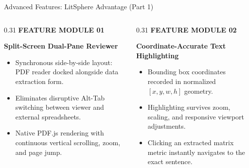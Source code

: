 \documentclass[aspectratio=169,10pt]{beamer}
\begin{document}
\begin{frame}{Advanced Features: LitSphere Advantage (Part 1)}
\vspace{-0.15cm}
\begin{columns}[T]
  \begin{column}{0.31\textwidth}
    {\fontsize{6.8pt}{8.5pt}\selectfont\bfseries\color{SubText} FEATURE MODULE 01}\par\vspace{2pt}
    {\fontsize{9.5pt}{11.5pt}\selectfont\bfseries\color{DarkText} Split-Screen Dual-Pane Reviewer}\par\vspace{4pt}
    {\fontsize{7.2pt}{9.2pt}\selectfont\color{DarkText}
    \begin{itemize}
      \item Synchronous side-by-side layout: PDF reader docked alongside data extraction form.
      \item Eliminates disruptive Alt-Tab switching between viewer and external spreadsheets.
      \item Native PDF.js rendering with continuous vertical scrolling, zoom, and page jump.
    \end{itemize}}
  \end{column}

  \begin{column}{0.31\textwidth}
    {\fontsize{6.8pt}{8.5pt}\selectfont\bfseries\color{SubText} FEATURE MODULE 02}\par\vspace{2pt}
    {\fontsize{9.5pt}{11.5pt}\selectfont\bfseries\color{DarkText} Coordinate-Accurate Text Highlighting}\par\vspace{4pt}
    {\fontsize{7.2pt}{9.2pt}\selectfont\color{DarkText}
    \begin{itemize}
      \item Bounding box coordinates recorded in normalized $[x, y, w, h]$ geometry.
      \item Highlighting survives zoom, scaling, and responsive viewport adjustments.
      \item Clicking an extracted matrix metric instantly navigates to the exact sentence.
    \end{itemize}}
  \end{column}


\end{columns}
\end{frame}
\end{document}
